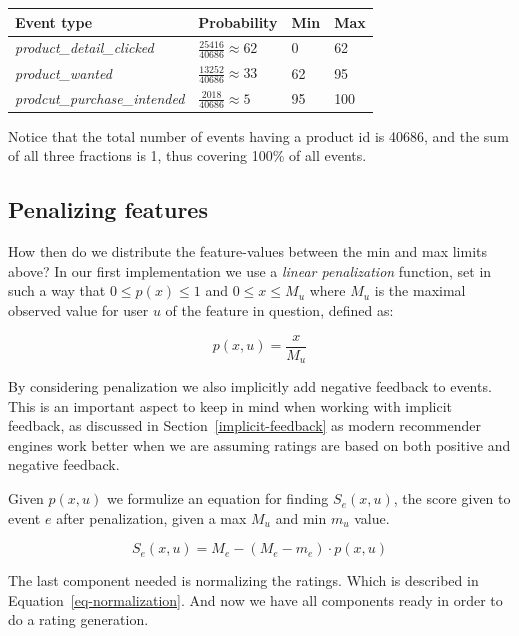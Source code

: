 \begin{table}[H]
  \centering
  \begin{tabular}{llll}
    \toprule
      Event type & Probability & Min & Max \\
    \midrule
      \textit{product\_detail\_clicked}     & $\frac{25416}{40686} \approx 62$  & 0   & 62  \\[1.5ex]
      \textit{product\_wanted}              & $\frac{13252}{40686} \approx 33$  & 62  & 95  \\[1.5ex]
      \textit{prodcut\_purchase\_intended}  & $\frac{2018}{40686} \approx 5$    & 95  & 100 \\
    \bottomrule
  \end{tabular}
\end{table}

Notice that the total number of events having a product id is 40686, and the
sum of all three fractions is 1, thus covering 100\% of all events.

\subsection{Penalizing features}

How then do we distribute the feature-values  between the min and max limits
above? In our first implementation we use a \textit{linear penalization}
function, set in such a way that $0 \leq p(x) \leq 1$ and $0 \leq x \leq M_u$
where $M_u$ is the maximal observed value for user $u$ of the feature in
question, defined as:

\begin{equation}
  p(x, u) = \frac{x}{M_u}
\end{equation}

By considering penalization we also implicitly add negative feedback to events.
This is an important aspect to keep in mind when working with implicit
feedback, as discussed in Section~\ref{implicit-feedback} as modern recommender
engines work better when we are assuming ratings are based on both positive and
negative feedback.

Given $p(x, u)$ we formulize an equation for finding $S_e(x, u)$, the score
given to event $e$ after penalization, given a max $M_u$ and min $m_u$ value.

\begin{equation}
  S_e(x,u) = M_e - (M_e - m_e) \cdot p(x, u)
\end{equation}

The last component needed is normalizing the ratings. Which is described in
Equation~\ref{eq-normalization}. And now we have all components ready in order
to do a rating generation. 

